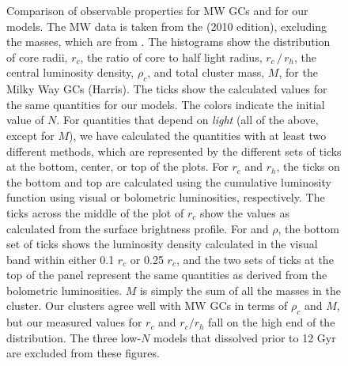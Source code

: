 \documentclass[12pt,preprint]{aastex}
\begin{document}


\begin{figure} [!ht]

	\caption{Comparison of observable properties for MW GCs and for our models. The MW data is taken from the \citealt{Harris1996} (2010 edition), excluding the masses, which are from \citealt{Gnedin1997}. The histograms show the distribution of core radii, $r_c$, the ratio of core to half light radius, $r_c\, /\, r_h$, the central luminosity density, $\rho_c$, and total cluster mass, $M$, for the Milky Way GCs (Harris). The ticks show the calculated values for the same quantities for our models. The colors indicate the initial value of $N$. For quantities that depend on \emph{light} (all of the above, except for $M$), we have calculated the quantities with at least two different methods, which are represented by the different sets of ticks at the bottom, center, or top of the plots. For $r_c$ and $r_h$, the ticks on the bottom and top are calculated using the cumulative luminosity function using visual or bolometric luminosities, respectively. The ticks across the middle of the plot of $r_c$ show the values as calculated from the surface brightness profile. For and $\rho$, the bottom set of ticks shows the luminosity density calculated in the visual band within either 0.1 $r_c$ or 0.25 $r_c$, and the two sets of ticks at the top of the panel represent the same quantities as derived from the bolometric luminosities. $M$ is simply the sum of all the masses in the cluster. Our clusters agree well with MW GCs in terms of $\rho_c$ and $M$, but our measured values for $r_c$ and $r_c / r_h$ fall on the high end of the distribution. The three low-$N$ models that dissolved prior to 12 Gyr are excluded from these figures.}

	\label{fig:MW_histograms}
\end{figure}
\end{document}
